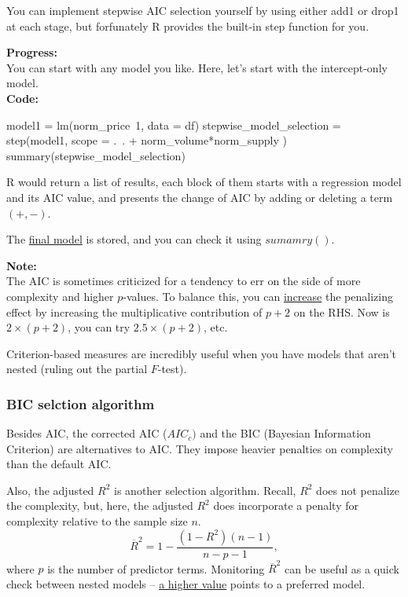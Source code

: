 \documentclass[12pt]{article}
\begin{document}
You can implement stepwise AIC selection yourself by using either
add1 or drop1 at each stage, but forfunately R provides the built-in
step function for you.

{\textbf {Progress:}}\\
You can start with any model you like. Here, let's start with the
intercept-only model.\\

{\textbf {Code:}}
\begin{rc}
model1 = lm(norm_price~1, data = df)
stepwise_model_selection = step(model1, 
				scope = .~. + norm_volume*norm_supply
)
summary(stepwise_model_selection)
\end{rc}


R would return a list of results, each block of them starts with a 
regression model and its AIC value, and presents the change of AIC
by adding or deleting a term $ ( + , - ) $. 

The {\underline {final model}} is stored, and you can check it using
$ sumamry() $. 

{\textbf {Note:}}\\
The AIC is sometimes criticized for a tendency to err on the side of
more complexity and higher $ p $-values. To balance this, you can 
{\underline {increase}} the penalizing effect by increasing the
multiplicative contribution of $ p + 2 $ on the RHS. Now is 
$ 2  \times (p + 2) $, you can try $ 2.5  \times (p + 2) $, etc.

Criterion-based measures are incredibly useful when you have models that
aren't nested (ruling out the partial $ F $-test).




\subsubsection{BIC selction algorithm}
Besides AIC, the corrected AIC ($ AIC_{c}) $ and the BIC
(Bayesian Information Criterion) are alternatives to AIC. They
impose heavier penalties on complexity than the default AIC.

Also, the adjusted $ R^{2} $ is another selection algorithm. Recall,
$ R^{2} $ does not penalize the complexity, but, here, the adjusted
$ R^{2} $ does incorporate a penalty for complexity relative to 
the sample size $ n $.
\begin{equation*}
		\overline{R}^{2} = 1  - \frac{(1 - R^{2})(n - 1)}
		{n - p - 1},
\end{equation*}
where $ p $ is the number of predictor terms. Monitoring
$  \overline{R}^{2} $ can be useful as a quick check between nested 
models -- {\underline {a higher value}} points to a preferred model.
\end{document}
